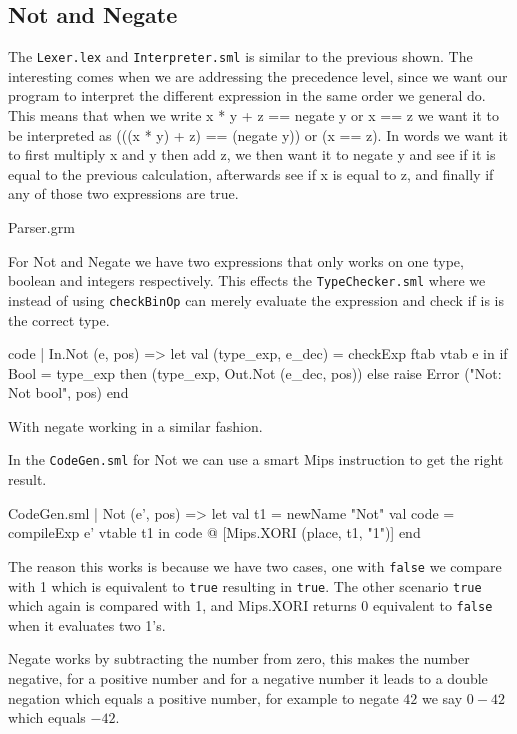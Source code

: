 \documentclass[11pt,a4paper,oneside]{report}
\begin{document}
\subsection*{Not and Negate}

The \texttt{Lexer.lex} and \texttt{Interpreter.sml} is similar to the previous shown. The interesting comes when we are addressing the precedence level, since we want our program to interpret the different expression in the same order we general do. This means that when we write x * y + z == negate y or x == z we want it to be interpreted as (((x * y) + z) == (negate y)) or (x == z). In words we want it to first multiply x and y then add z, we then want it to negate y and see if it is equal to the previous calculation, afterwards see if x is equal to z, and finally if any of those two expressions are true.
\begin{code}[firstnumber=22]{Parser.grm}
\end{code}

For Not and Negate we have two expressions that only works on one type, boolean and integers respectively. This effects the \texttt{TypeChecker.sml} where we instead of using \texttt{checkBinOp} can merely evaluate the expression and check if is is the correct type.
\begin{code}[firstnumber=132]{code}
    | In.Not (e, pos)
      =>  let
            val (type_exp, e_dec) = checkExp ftab vtab e
          in
            if Bool = type_exp
            then (type_exp, Out.Not (e_dec, pos))
            else raise Error ("Not: Not bool", pos)
          end
\end{code}
With negate working in a similar fashion.

In the \texttt{CodeGen.sml} for Not we can use a smart Mips instruction to get the right result.
\begin{code}[firstnumber=258]{CodeGen.sml}
  | Not (e', pos) =>
      let
        val t1 = newName "Not"
        val code = compileExp e' vtable t1
      in
        code @ [Mips.XORI (place, t1, "1")]
      end
\end{code}
The reason this works is because we have two cases, one with \texttt{false} we compare with 1 which is equivalent to \texttt{true} resulting in \texttt{true}. The other scenario \texttt{true} which again is compared with 1, and Mips.XORI returns 0 equivalent to \texttt{false} when it evaluates two 1's.


Negate works by subtracting the number from zero, this makes the number negative, for a positive number and for a negative number it leads to a double negation which equals a positive number, for example to negate $42$ we say $0 - 42$ which equals $-42$.
\end{document}
